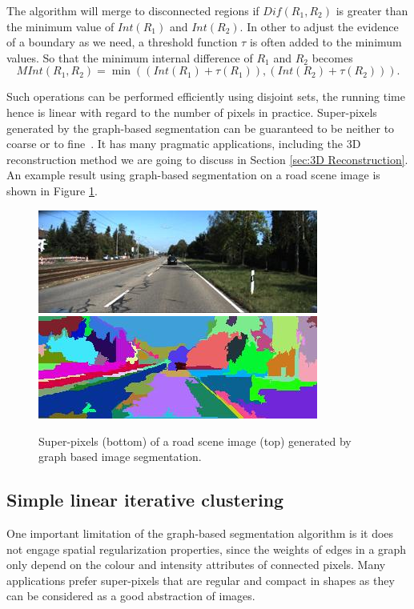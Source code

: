 The algorithm will merge to disconnected regions if $Dif(R_1,R_2)$ is greater than the minimum value of $Int(R_1)$ and $Int(R_2)$. In other to adjust the evidence of a boundary as we need, a threshold function $\tau$ is often added to the minimum values. So that the minimum internal difference of $R_1$ and $R_2$ becomes
\begin{equation}
	MInt(R_1,R_2) = \min((Int(R_1)+\tau(R_1)),(Int(R_2)+\tau(R_2))).
\end{equation}

Such operations can be performed efficiently using disjoint sets, the running time hence is linear with regard to the number of pixels in practice. Super-pixels generated by the graph-based segmentation can be guaranteed to be neither to coarse or to fine~\cite{felzenszwalb2004efficient}. It has many pragmatic applications, including the 3D reconstruction method we are going to discuss in Section \ref{sec:3D Reconstruction}. An example result using graph-based segmentation on a road scene image is shown in Figure \ref{gsuperfig}.

\begin{figure}[h!]
\centering
\includegraphics[width=0.7\linewidth]{pics/super1.jpg}
\includegraphics[width=0.7\linewidth]{pics/super2.jpg}
\caption{Super-pixels (bottom) of a road scene image (top) generated by graph based image segmentation.}
\label{gsuperfig}
\end{figure}

\subsection{Simple linear iterative clustering}
\label{sec:Simple linear iterative clustering}
One important limitation of the graph-based segmentation algorithm is it does not engage spatial regularization properties, since the weights of edges in a graph only depend on the colour and intensity attributes of connected pixels. Many applications prefer super-pixels that are regular and compact in shapes as they can be considered as a good abstraction of images. 

